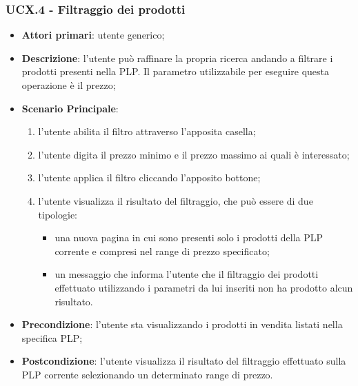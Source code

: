 \subsubsection{UCX.4 - Filtraggio dei prodotti}
\begin{itemize}
\item \textbf{Attori primari}: utente generico;
\item \textbf{Descrizione}: l'utente può raffinare la propria ricerca andando a filtrare i prodotti presenti nella PLP. Il parametro utilizzabile per eseguire questa operazione è il prezzo;
\item \textbf{Scenario Principale}:
\begin{enumerate}
\item l'utente abilita il filtro attraverso l'apposita casella;
\item l'utente digita il prezzo minimo e il prezzo massimo ai quali è interessato;
\item l'utente applica il filtro cliccando l'apposito bottone;
\item l'utente visualizza il risultato del filtraggio, che può essere di due tipologie:
\begin{itemize}
\item una nuova pagina in cui sono presenti solo i prodotti della PLP corrente e compresi nel range di prezzo specificato;
\item un messaggio che informa l'utente che il filtraggio dei prodotti effettuato utilizzando i parametri da lui inseriti non ha prodotto alcun risultato.
\end{itemize}
\end{enumerate}
\item \textbf{Precondizione}: l'utente sta visualizzando i prodotti in vendita listati nella specifica PLP;
\item \textbf{Postcondizione}: l'utente visualizza il risultato del filtraggio effettuato sulla PLP corrente selezionando un determinato range di prezzo.
\end{itemize}
